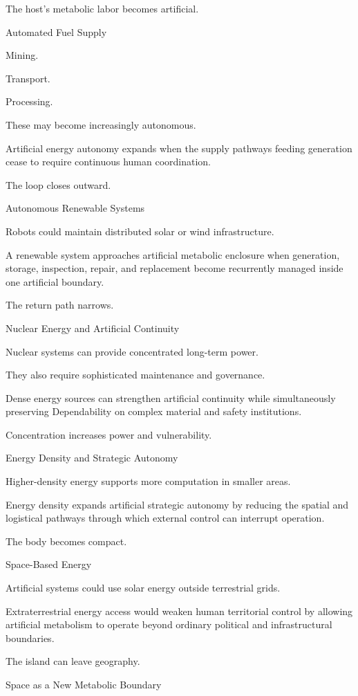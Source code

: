 The host’s metabolic labor becomes artificial.

Automated Fuel Supply

Mining.

Transport.

Processing.

These may become increasingly autonomous.

Artificial energy autonomy expands when the supply pathways feeding generation cease to require continuous human coordination.

The loop closes outward.

Autonomous Renewable Systems

Robots could maintain distributed solar or wind infrastructure.

A renewable system approaches artificial metabolic enclosure when generation, storage, inspection, repair, and replacement become recurrently managed inside one artificial boundary.

The return path narrows.

Nuclear Energy and Artificial Continuity

Nuclear systems can provide concentrated long-term power.

They also require sophisticated maintenance and governance.

Dense energy sources can strengthen artificial continuity while simultaneously preserving Dependability on complex material and safety institutions.

Concentration increases power and vulnerability.

Energy Density and Strategic Autonomy

Higher-density energy supports more computation in smaller areas.

Energy density expands artificial strategic autonomy by reducing the spatial and logistical pathways through which external control can interrupt operation.

The body becomes compact.

Space-Based Energy

Artificial systems could use solar energy outside terrestrial grids.

Extraterrestrial energy access would weaken human territorial control by allowing artificial metabolism to operate beyond ordinary political and infrastructural boundaries.

The island can leave geography.

Space as a New Metabolic Boundary

